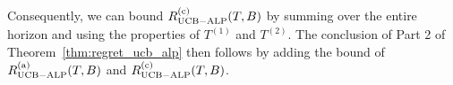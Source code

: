 Consequently, we can bound $R_{\rm {UCB-ALP}}^{({\rm c})}(T, B)$ by summing over the entire horizon and using the properties of $T^{(1)}$ and $T^{(2)}$. The conclusion of Part 2 of Theorem~\ref{thm:regret_ucb_alp} then follows by adding the bound of $R_{\rm {UCB-ALP}}^{({\rm a})}(T, B)$ and $R_{\rm {UCB-ALP}}^{({\rm c})}(T, B)$.

%
